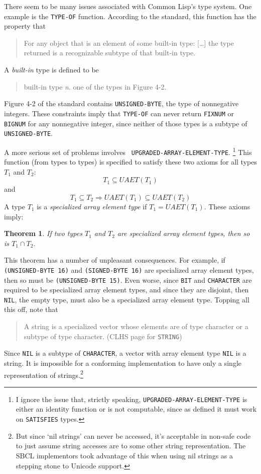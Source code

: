 \documentclass[11pt]{article}
\newtheorem{theorem}{Theorem}
\begin{document}
There seem to be many issues associated with Common Lisp's type
system.  One example is the {\tt TYPE-OF} function.  According
to the standard, this function has the property that
\begin{quote}
  For any object that is an element of some built-in type: [\ldots]
  the type returned is a recognizable subtype of that built-in type.
\end{quote}
A \emph{built-in} type is defined to be
\begin{quote}
  built-in type {\it n}. one of the types in Figure 4-2.
\end{quote}
Figure 4-2 of the standard contains {\tt UNSIGNED-BYTE}, the type of
nonnegative integers.  These constraints imply that {\tt TYPE-OF} can
never return {\tt FIXNUM} or {\tt BIGNUM} for any nonnegative integer,
since neither of those types is a subtype of {\tt UNSIGNED-BYTE}.

A more serious set of problems involves {\tt
UPGRADED-ARRAY-ELEMENT-TYPE}. \footnote{I ignore the issue that,
strictly speaking, {\tt UPGRADED-ARRAY-ELEMENT-TYPE} is either an
identity function or is not computable, since as defined it must work
on {\tt SATISFIES} types.}  This function (from types to types) is
specified to satisfy these two axioms for all types $T_1$ and $T_2$:
\begin{displaymath}
   T_1 \subseteq UAET(T_1) 
\end{displaymath}
and
\begin{displaymath}
   T_1 \subseteq T_2 \Longrightarrow UAET(T_1) \subseteq UAET(T_2)
\end{displaymath}
A type $T_1$ is a \emph{specialized array element type} if $T_1 = UAET(T_1)$.
These axioms imply:
\begin{theorem}
If two types $T_1$ and $T_2$ are specialized
array element types, then so is $T_1 \cap T_2$.
\end{theorem}

This theorem has a number of unpleasant consequences.  For example,
if {\tt (UNSIGNED-BYTE 16)} and {\tt (SIGNED-BYTE 16)} are specialized
array element types, then so must be {\tt (UNSIGNED-BYTE 15)}.  Even
worse, since {\tt BIT} and {\tt CHARACTER} are required to be
specialized array element types, and since they are disjoint,
then {\tt NIL}, the empty type, must also be a specialized array
element type.  Topping all this off, note that
\begin{quote}
    A string is a specialized vector whose elements are of type
    character or a subtype of type character. (CLHS page for {\tt STRING})
\end{quote}
Since {\tt NIL} is a subtype of {\tt CHARACTER}, a vector with
array element type {\tt NIL} is a string.  It is
impossible for a conforming implementation to have only a
single representation of strings.\footnote{But since `nil strings' can
never be accessed, it's acceptable in non-safe code to just assume 
string accesses are to some other string representation.  The SBCL
implementors took advantage of this when using nil strings as a stepping
stone to Unicode support.}
\end{document}
